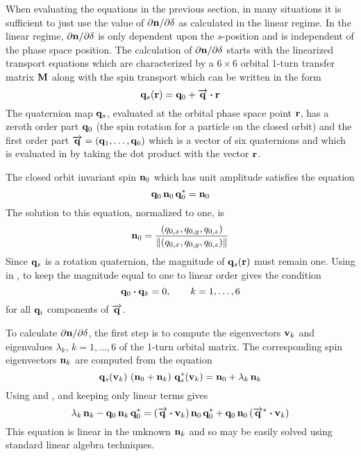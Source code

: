 When evaluating the equations in the previous section, in many situations it is sufficient to just
use the value of $\partial{\bf n}/\partial\delta$ as calculated in the linear regime. In the linear regime,
$\partial{\bf n}/\partial\delta$ is only dependent upon the $s$-position and is independent of the phase space
position. The calculation of $\partial{\bf n}/\partial\delta$ starts with the linearized transport equations which
are characterized by a $6\times6$ orbital 1-turn transfer matrix ${\bf M}$ along with the spin
transport which can be written in the form
\begin{equation}
  {\bf q}_s({\bf r}) = {\bf q}_0 + \overrightarrow{{\bf q}} \mathbin{\boldsymbol{\cdot}} {\bf r}
  \label{qqqr}
\end{equation}
The quaternion map ${\bf q}_s$, evaluated at the orbital phase space point ${\bf r}$, has a zeroth order
part ${\bf q}_0$ (the spin rotation for a particle on the closed orbit) and the first order part
$\overrightarrow{{\bf q}} = ({\bf q}_1, \ldots, {\bf q}_6)$ which is a vector of six quaternions and which is
evaluated in  by taking the dot product with the vector ${\bf r}$.

The closed orbit invariant spin ${\bf n}_0$ which has unit amplitude satisfies the equation
\begin{equation}
  {\bf q}_0 \, {\bf n}_0 \, {\bf q}_0^* = {\bf n}_0
  \label{qnqn}
\end{equation}
The solution to this equation, normalized to one, is
\begin{equation}
  {\bf n}_0 = \frac{(q_{0,x}, q_{0,y}, q_{0,z})}{\|(q_{0,x}, q_{0,y}, q_{0,z})\|}
  \label{nkqqq}
\end{equation}
Since ${\bf q}_s$ is a rotation quaternion, the magnitude of ${\bf q}_s({\bf r})$ must remain one. Using
 in , to keep the magnitude equal to one to linear order gives the condition
\begin{equation}
  {\bf q}_0 \mathbin{\boldsymbol{\cdot}} {\bf q}_k = 0, \qquad k = 1, \ldots, 6
\end{equation}
for all ${\bf q}_i$ components of $\overrightarrow{{\bf q}}$.

To calculate $\partial{\bf n}/\partial\delta$, the first step is to compute the eigenvectors ${\bf v}_k$ and
eigenvalues $\lambda_k$, $k = 1, \ldots, 6$ of the 1-turn orbital matrix. The
corresponding spin eigenvectors ${\bf n}_k$ are computed from the equation
\begin{equation}
  {\bf q}_s({\bf v}_k) \,\, ({\bf n}_0 + {\bf n}_k) \,\, {\bf q}_s^*({\bf v}_k) = {\bf n}_0 + \lambda_k \, {\bf n}_k
  \label{qnnq}
\end{equation}
Using  and , and keeping only linear terms gives
\begin{equation}
  \lambda_k \, {\bf n}_k - {\bf q}_0 \, {\bf n}_k \, {\bf q}_0^* = 
  (\overrightarrow{{\bf q}} \mathbin{\boldsymbol{\cdot}} {\bf v}_k) \, {\bf n}_0 \, {\bf q}_0^* + 
  {\bf q}_0 \, {\bf n}_0 \, (\overrightarrow{{\bf q}}^* \mathbin{\boldsymbol{\cdot}} {\bf v}_k)
  \label{lnqnq}
\end{equation}
This equation is linear in the unknown ${\bf n}_k$ and so may be easily solved using standard linear
algebra techniques.

